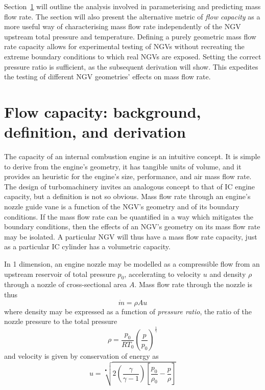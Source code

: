 \documentclass[a4paper, 11pt, oneside]{report}
\begin{document}
Section~\ref{flow_capacity_background_definition_and_derivation} will outline the analysis involved in parameterising and predicting mass flow rate. The section will also present the alternative metric of \textit{flow capacity} as a more useful way of characterising mass flow rate independently of the NGV upstream total pressure and temperature. Defining a purely geometric mass flow rate capacity allows for experimental testing of NGVs without recreating the extreme boundary conditions to which real NGVs are exposed. Setting the correct pressure ratio is sufficient, as the subsequent derivation will show. This expedites the testing of different NGV geometries' effects on mass flow rate.

\newpage
\section{Flow capacity: background, definition, and derivation}
\label{flow_capacity_background_definition_and_derivation}

The capacity of an internal combustion engine is an intuitive concept. It is simple to derive from the engine's geometry, it has tangible units of volume, and it provides an heuristic for the engine's size, performance, and air mass flow rate. The design of turbomachinery invites an analogous concept to that of IC engine capacity, but a definition is not so obvious. Mass flow rate through an engine's nozzle guide vane is a function of the NGV's geometry and of its boundary conditions. If the mass flow rate can be quantified in a way which mitigates the boundary conditions, then the effects of an NGV's geometry on its mass flow rate may be isolated. A particular NGV will thus have a mass flow rate capacity, just as a particular IC cylinder has a volumetric capacity.

In 1 dimension, an engine nozzle may be modelled as a compressible flow from an upstream reservoir of total pressure $p_0$, accelerating to velocity $u$ and density $\rho$ through a nozzle of cross-sectional area $A$. Mass flow rate through the nozzle is thus
\begin{equation}
\dot{m} = \rho A u
\end{equation}
where density may be expressed as a function of \textit{pressure ratio}, the ratio of the nozzle pressure to the total pressure
\begin{equation}
\rho = \frac{p_0}{R T_0} \left(\frac{p}{p_0}\right)^\frac{1}{\gamma}
\end{equation}
and velocity is given by conservation of energy as
\begin{equation}\label{compressible_bernouilli}
u =
\sqrt[•]{ 
	2 \left( \frac{\gamma}{\gamma - 1} \right) \left[ \frac{p_0}{\rho_0} - \frac{p}{\rho} \right] 
}
\end{equation}
\end{document}
